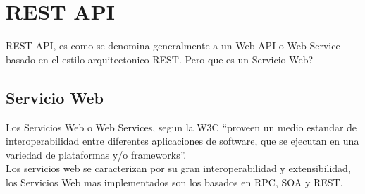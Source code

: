 
\section{REST API}
\label{sec:REST API}

REST API, es como se denomina generalmente a un Web API o Web Service basado en el estilo arquitectonico REST. Pero que es un Servicio Web?

\subsection{Servicio Web}
\label{sub:Servicio Web}

Los Servicios Web o Web Services, segun la W3C ``proveen un medio estandar de interoperabilidad entre diferentes aplicaciones de software, que se ejecutan en una variedad de plataformas y/o frameworks''.\cite{w3c_web_service} \\

Los servicios web se caracterizan por su gran interoperabilidad y extensibilidad, los Servicios Web mas implementados son los basados en RPC, SOA y REST.

